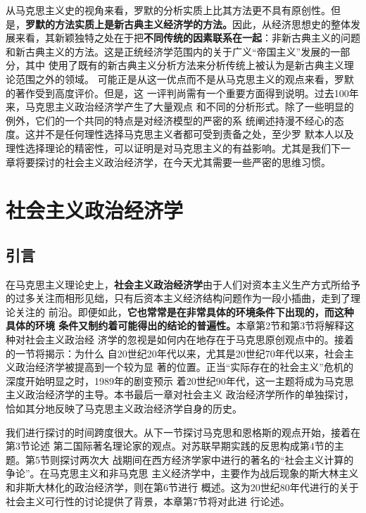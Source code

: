 从马克思主义史的视角来看，罗默的分析实质上比其方法更不具有原创性。但
是，\textbf{罗默的方法实质上是新古典主义经济学的方法。}因此，从经济思想史的整体发
展来看，其新颖独特之处在于把\textbf{不同传统的因素联系在一起}：非新古典主义的问题
和新古典主义的方法。这是正统经济学范围内的关于广义“帝国主义”发展的一部分，其中
使用了既有的新古典主义分析方法来分析传统上被认为是新古典主义理论范围之外的领域。
可能正是从这一优点而不是从马克思主义的观点来看，罗默的著作受到高度评价。但是，这
一评判尚需有一个重要方面得到说明。过去100年来，马克思主义政治经济学产生了大量观点
和不同的分析形式。除了一些明显的例外，它们的一个共同的特点是对经济模型的严密的系
统阐述持漫不经心的态度。这并不是任何理性选择马克思主义者都可受到责备之处，至少罗
默本人以及理性选择理论的精密性，可以证明是对马克思主义的有益影响。尤其是我们下一
章将要探讨的社会主义政治经济学，在今天尤其需要一些严密的思维习惯。



\chapter{社会主义政治经济学}

\section{引言}

在马克思主义理论史上，\textbf{社会主义政治经济学}由于人们对资本主义生产方式所给予
的过多关注而相形见绌，只有后资本主义经济结构问题作为一段小插曲，走到了理论关注的
前沿。即便如此，\textbf{它也常常是在非常具体的环境条件下出现的，而这种具体的环境
  条件又制约着可能得出的结论的普遍性。}本章第2节和第3节将解释这种对社会主义政治经
济学的忽视是如何内在地存在于马克思原创观点中的。接着的一节将揭示：为什么
自20世纪20年代以来，尤其是20世纪70年代以来，社会主义政治经济学被提高到一个较为显
著的位置。正当“实际存在的社会主义”危机的深度开始明显之时，1989年的剧变预示
着20世纪90年代，这一主题将成为马克思主义政治经济学的主导。本书最后一章对社会主义
政治经济学所作的单独探讨，恰如其分地反映了马克思主义政治经济学自身的历史。

我们进行探讨的时间跨度很大。从下一节探讨马克思和恩格斯的观点开始，接着在第3节论述
第二国际著名理论家的观点。对苏联早期实践的反思构成第4节的主题。第5节则探讨两次大
战期间在西方经济学家中进行的著名的“社会主义计算的争论”。在马克思主义和非马克思
主义经济学中，主要作为战后现象的斯大林主义和非斯大林化的政治经济学，则在第6节进行
概述。这为20世纪80年代进行的关于社会主义可行性的讨论提供了背景，本章第7节将对此进
行论述。

